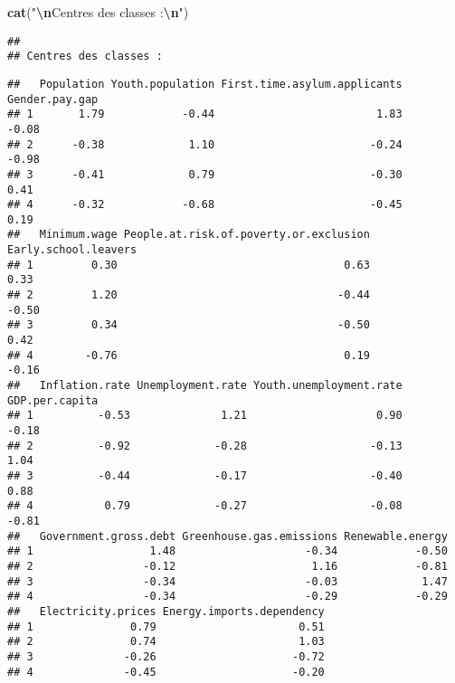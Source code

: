 \documentclass[
]{article}
\newenvironment{Shaded}{\begin{snugshade}}{\end{snugshade}}
\newcommand{\DecValTok}[1]{\textcolor[rgb]{0.00,0.00,0.81}{#1}}
\newcommand{\FunctionTok}[1]{\textcolor[rgb]{0.13,0.29,0.53}{\textbf{#1}}}
\newcommand{\NormalTok}[1]{#1}
\newcommand{\SpecialCharTok}[1]{\textcolor[rgb]{0.81,0.36,0.00}{\textbf{#1}}}
\newcommand{\StringTok}[1]{\textcolor[rgb]{0.31,0.60,0.02}{#1}}
\begin{document}
\begin{Shaded}
\begin{Highlighting}[]
\FunctionTok{cat}\NormalTok{(}\StringTok{"}\SpecialCharTok{\textbackslash{}n}\StringTok{Centres des classes :}\SpecialCharTok{\textbackslash{}n}\StringTok{"}\NormalTok{)}
\end{Highlighting}
\end{Shaded}

\begin{verbatim}
## 
## Centres des classes :
\end{verbatim}

\begin{Shaded}
\end{Shaded}

\begin{verbatim}
##   Population Youth.population First.time.asylum.applicants Gender.pay.gap
## 1       1.79            -0.44                         1.83          -0.08
## 2      -0.38             1.10                        -0.24          -0.98
## 3      -0.41             0.79                        -0.30           0.41
## 4      -0.32            -0.68                        -0.45           0.19
##   Minimum.wage People.at.risk.of.poverty.or.exclusion Early.school.leavers
## 1         0.30                                   0.63                 0.33
## 2         1.20                                  -0.44                -0.50
## 3         0.34                                  -0.50                 0.42
## 4        -0.76                                   0.19                -0.16
##   Inflation.rate Unemployment.rate Youth.unemployment.rate GDP.per.capita
## 1          -0.53              1.21                    0.90          -0.18
## 2          -0.92             -0.28                   -0.13           1.04
## 3          -0.44             -0.17                   -0.40           0.88
## 4           0.79             -0.27                   -0.08          -0.81
##   Government.gross.debt Greenhouse.gas.emissions Renewable.energy
## 1                  1.48                    -0.34            -0.50
## 2                 -0.12                     1.16            -0.81
## 3                 -0.34                    -0.03             1.47
## 4                 -0.34                    -0.29            -0.29
##   Electricity.prices Energy.imports.dependency
## 1               0.79                      0.51
## 2               0.74                      1.03
## 3              -0.26                     -0.72
## 4              -0.45                     -0.20
\end{verbatim}
\end{document}
